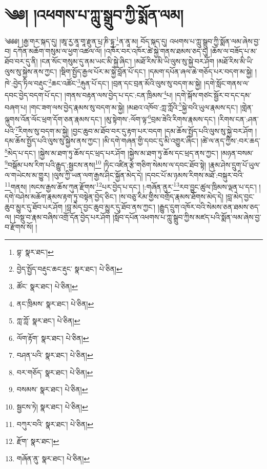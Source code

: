 \setcounter{footnote}{0} 
\chapter{༄༅། །འཕགས་པ་ཀླུ་སྒྲུབ་ཀྱི་སྨོན་ལམ།}༄༅༅། །རྒྱ་གར་སྐད་དུ། །ཨཱ་རྱ་ནཱ་གཱ་རྫུན་པྲ་ཎི་དྷཱ་\footnote{བྷ་  སྣར་ཐང་། }ན་ནཱ་མ། བོད་སྐད་དུ། འཕགས་པ་ཀླུ་སྒྲུབ་ཀྱི་སྨོན་ལམ་ཞེས་བྱ་བ། དཀོན་མཆོག་གསུམ་ལ་ཕྱག་འཚལ་ལོ། །འཁོར་བར་འཁོར་ཚེ་སྐྱེ་གནས་ཐམས་ཅད་དུ། །ཆོས་ལ་བཟོད་པ་མ་ཐོབ་བར་དུ་ནི། །ངན་སོང་གསུམ་དུ་ནམ་ཡང་མི་སྐྱེ་ཞིང་། །མཐོ་རིས་མི་ཡི་ལུས་སུ་སྐྱེ་བར་ཤོག །མཐོ་རིས་མི་ཡི་ལུས་སུ་སྐྱེས་ནས་ཀྱང་། །སྡིག་སྤྱོད་རྒྱལ་པོར་མ་སྐྱེ་བློན་པོ་དང་། །དམག་དཔོན་ཞལ་ཆེ་གཅོད་པར་བདག་མ་སྐྱེ། །ཁེ་:བྱེད་ཏིལ་བརྡུང་\footnote{བྱེད་སྤྱོད་བརྡུང་ཆང་རྡུང་  སྣར་ཐང་།  པེ་ཅིན། }ཆང་འཚོང་\footnote{ཚོང་  སྣར་ཐང་།  པེ་ཅིན། }རྐུན་པོ་དང་། །བྲན་དང་བྲན་མོའི་ལུས་སུ་བདག་མ་སྐྱེ། །དགེ་སློང་གནས་ལ་དབང་བྱེད་བདག་པོ་དང་། །གནས་བརྟན་ལས་བྱེད་པ་དང་:ངན་ཁྲིམས་\footnote{ནང་ཁྲིམས་  སྣར་ཐང་།  པེ་ཅིན། }པ། །དགེ་སྐོས་གཙང་སྦྱོར་བ་དང་དམ་བཞག་པ། །གང་ཟག་ལས་བྱེད་རྣམས་སུ་བདག་མ་སྐྱེ། །མཐའ་འཁོབ་:ཀླ་ཀློའི་\footnote{ཀླ་ཀློ་  སྣར་ཐང་།  པེ་ཅིན། }སྐྱེ་བའི་ཡུལ་རྣམས་དང་། །གླེན་ལྐུགས་འོན་ལོང་ཕྲག་དོག་ཅན་རྣམས་དང་། །མུ་སྟེགས་:ལོག་ལྟ་\footnote{ལོག་རྟོག་  སྣར་ཐང་།  པེ་ཅིན། }བྲམ་ཟེའི་རིགས་རྣམས་དང་། །རིགས་ངན་:ཤན་པའི་\footnote{བཤན་པའི་  སྣར་ཐང་།  པེ་ཅིན། }རིགས་སུ་བདག་མ་སྐྱེ། །བྱང་ཆུབ་མ་ཐོབ་བར་དུ་རྟག་པར་བདག །དམ་ཆོས་སྤྱོད་པའི་ལུས་སུ་སྐྱེ་བར་ཤོག །དམ་ཆོས་སྤྱོད་པའི་ལུས་སུ་སྐྱེས་ནས་ཀྱང་། །མི་དགེ་གཞན་གྱི་དབང་དུ་མི་འགྱུར་ཞིང་། །ཚེ་ལ་ནད་ཀྱིས་:བར་ཆད་\footnote{བར་གཅོད་  སྣར་ཐང་།  པེ་ཅིན། }མེད་པ་དང་། །སྐྱེས་མ་ཐག་ཏུ་ཆོས་དང་ཕྲད་པར་ཤོག །སྐྱེས་མ་ཐག་ཏུ་ཆོས་དང་ཕྲད་ནས་ཀྱང་། །མཉན་བསམ་\footnote{བསམས་  སྣར་ཐང་།  པེ་ཅིན། }བསྒོམ་པས་རིག་པའི་རྒྱུད་:སྦྱངས་ནས།\footnote{སྦྱངས་ཏེ།  སྣར་ཐང་།  པེ་ཅིན། } །ཏིང་འཛིན་རྩེ་གཅིག་སེམས་ལ་དབང་ཐོབ་སྟེ། །རྣམ་ཤེས་དྲུག་པོ་ཡུལ་ལ་གཡེངས་མ་གྱུར། །ལུས་ཀྱི་ཡན་ལག་རྒྱས་ཤིང་སྐྱོན་མེད་དེ། །དབང་པོ་མ་ཉམས་རིགས་མཐོ་:བསྐུར་བའི་\footnote{བཀུར་བའི་  སྣར་ཐང་།  པེ་ཅིན། }གནས། །སངས་རྒྱས་ཆོས་ཀུན་རྫོགས་\footnote{རྫོག་  སྣར་ཐང་། }པར་བྱེད་པ་དང་། །:གཞོན་ནུར་\footnote{གཞོན་ནུ་  སྣར་ཐང་།  པེ་ཅིན། }རབ་བྱུང་ཚུལ་ཁྲིམས་ལྡན་པ་དང་། །དགེ་བཤེས་མཆོག་རྣམས་རྟག་ཏུ་བསྟེན་བྱེད་ཅིང་། །ས་བཅུ་རིམ་གྱིས་བགྲོད་རྣམས་ཐོགས་མེད་དེ། །བླ་མེད་བྱང་ཆུབ་མྱུར་དུ་ཐོབ་པར་ཤོག །བླ་མེད་བྱང་ཆུབ་མྱུར་དུ་ཐོབ་ནས་ཀྱང་། །རྒྱུད་དྲུག་འཁོར་བའི་སེམས་ཅན་ཐམས་ཅད་ལ། །བསྡུ་བ་རྣམ་བཞིས་འགྲོ་དོན་བྱེད་པར་ཤོག །སློབ་དཔོན་འཕགས་པ་ཀླུ་སྒྲུབ་ཀྱིས་མཛད་པའི་སྨོན་ལམ་ཞེས་བྱ་བ་རྫོགས་སོ། །